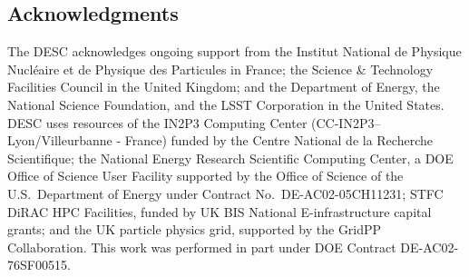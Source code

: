 \documentclass[\docopts]{\docclass}
\newcommand{\aim}[1]{\textcolor{red}{#1}}
\begin{document}
\subsection*{Acknowledgments}
The DESC acknowledges ongoing support from the Institut National de Physique Nucl\'eaire et de Physique des Particules in France; the Science \& Technology Facilities Council in the United Kingdom; and the Department of Energy, the National Science Foundation, and the LSST Corporation in the United States.  DESC uses resources of the IN2P3 Computing Center (CC-IN2P3--Lyon/Villeurbanne - France) funded by the Centre National de la Recherche Scientifique; the National Energy Research Scientific Computing Center, a DOE Office of Science User Facility supported by the Office of Science of the U.S.\ Department of Energy under Contract No.\ DE-AC02-05CH11231; STFC DiRAC HPC Facilities, funded by UK BIS National E-infrastructure capital grants; and the UK particle physics grid, supported by the GridPP Collaboration.  This work was performed in part under DOE Contract DE-AC02-76SF00515.



%
%
%
%
%
%
%
%
%
%
%
\end{document}

